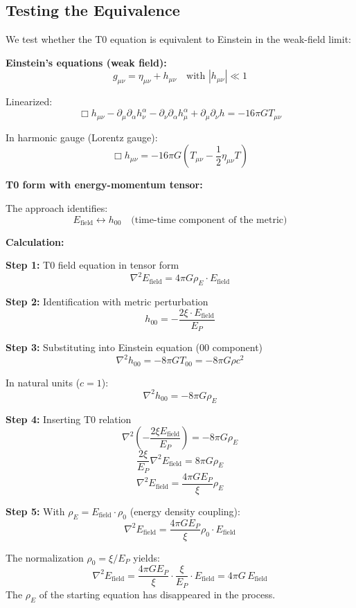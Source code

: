 	\subsection*{\textbf{Testing the Equivalence}}
	
	We test whether the T0 equation is equivalent to Einstein in the weak-field limit:
	
	\textbf{Einstein's equations (weak field):}
	\[
	g_{\mu\nu} = \eta_{\mu\nu} + h_{\mu\nu} \quad \text{with } |h_{\mu\nu}| \ll 1
	\]
	
	Linearized:
	\[
	\Box h_{\mu\nu} - \partial_\mu \partial_\alpha h^\alpha_\nu - \partial_\nu \partial_\alpha h^\alpha_\mu + \partial_\mu \partial_\nu h = -16\pi G T_{\mu\nu}
	\]
	
	In harmonic gauge (Lorentz gauge):
	\[
	\Box h_{\mu\nu} = -16\pi G \left(T_{\mu\nu} - \frac{1}{2}\eta_{\mu\nu}T\right)
	\]
	
	\textbf{T0 form with energy-momentum tensor:}
	
	The approach identifies:
	\[
	E_{\text{field}} \leftrightarrow h_{00} \quad \text{(time-time component of the metric)}
	\]
	
	\textbf{Calculation:}
	
	\textbf{Step 1:} T0 field equation in tensor form
	\[
	\nabla^2 E_{\text{field}} = 4\pi G \rho_E \cdot E_{\text{field}}
	\]
	
	\textbf{Step 2:} Identification with metric perturbation
	\[
	h_{00} = -\frac{2\xi \cdot E_{\text{field}}}{E_P}
	\]
	
	\textbf{Step 3:} Substituting into Einstein equation (00 component)
	\[
	\nabla^2 h_{00} = -8\pi G T_{00} = -8\pi G \rho c^2
	\]
	
	In natural units ($c=1$):
	\[
	\nabla^2 h_{00} = -8\pi G \rho_E
	\]
	
	\textbf{Step 4:} Inserting T0 relation
	\[
	\nabla^2 \left(-\frac{2\xi E_{\text{field}}}{E_P}\right) = -8\pi G \rho_E
	\]
	\[
	\frac{2\xi}{E_P} \nabla^2 E_{\text{field}} = 8\pi G \rho_E
	\]
	\[
	\nabla^2 E_{\text{field}} = \frac{4\pi G E_P}{\xi} \rho_E
	\]
	
	\textbf{Step 5:} With $\rho_E = E_{\text{field}} \cdot \rho_0$ (energy density coupling):
	\[
	\nabla^2 E_{\text{field}} = \frac{4\pi G E_P}{\xi} \rho_0 \cdot E_{\text{field}}
	\]
	
	The normalization $\rho_0 = \xi/E_P$ yields:
	\[
	\nabla^2 E_{\text{field}} = \frac{4\pi G E_P}{\xi}\cdot\frac{\xi}{E_P}\cdot E_{\text{field}} = 4\pi G\,E_{\text{field}}
	\]
	The $\rho_E$ of the starting equation has disappeared in the process.
	
